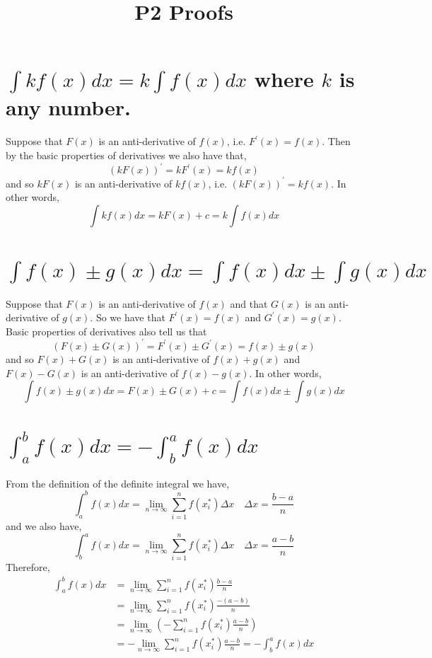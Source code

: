 \documentclass[10pt]{article}
\title{P2 Proofs }
\author{}
\date{}
\begin{document}
\maketitle
\section{$\int k f(x) d x=k \int f(x) d x$ where $k$ is any number. }
Suppose that $F(x)$ is an anti-derivative of $f(x)$, i.e. $F^{\prime}(x)=f(x)$. Then by the basic properties of derivatives we also have that,
$$
(k F(x))^{\prime}=k F^{\prime}(x)=k f(x)
$$
and so $k F(x)$ is an anti-derivative of $k f(x)$, i.e. $(k F(x))^{\prime}=k f(x)$. In other words,
$$
\int k f(x) d x=k F(x)+c=k \int f(x) d x
$$

\section{$\int f(x) \pm g(x) d x=\int f(x) d x \pm \int g(x) d x$}
Suppose that $F(x)$ is an anti-derivative of $f(x)$ and that $G(x)$ is an anti-derivative of $g(x)$. So we have that $F^{\prime}(x)=f(x)$ and $G^{\prime}(x)=g(x)$. Basic properties of derivatives also tell us that
$$
(F(x) \pm G(x))^{\prime}=F^{\prime}(x) \pm G^{\prime}(x)=f(x) \pm g(x)
$$
and so $F(x)+G(x)$ is an anti-derivative of $f(x)+g(x)$ and $F(x)-G(x)$ is an anti-derivative of $f(x)-g(x)$. In other words,
$$
\int f(x) \pm g(x) d x=F(x) \pm G(x)+c=\int f(x) d x \pm \int g(x) d x
$$

\section{$\int_{a}^{b} f(x) d x=-\int_{b}^{a} f(x) d x$}
From the definition of the definite integral we have,
$$
\int_{a}^{b} f(x) d x=\lim _{n \rightarrow \infty} \sum_{i=1}^{n} f\left(x_{i}^{*}\right) \Delta x \quad \Delta x=\frac{b-a}{n}
$$
and we also have,
$$
\int_{b}^{a} f(x) d x=\lim _{n \rightarrow \infty} \sum_{i=1}^{n} f\left(x_{i}^{*}\right) \Delta x \quad \Delta x=\frac{a-b}{n}
$$
Therefore,
$$
\begin{aligned}
\int_{a}^{b} f(x) d x &=\lim _{n \rightarrow \infty} \sum_{i=1}^{n} f\left(x_{i}^{*}\right) \frac{b-a}{n} \\
&=\lim _{n \rightarrow \infty} \sum_{i=1}^{n} f\left(x_{i}^{*}\right) \frac{-(a-b)}{n} \\
&=\lim _{n \rightarrow \infty}\left(-\sum_{i=1}^{n} f\left(x_{i}^{*}\right) \frac{a-b}{n}\right) \\
&=-\lim _{n \rightarrow \infty} \sum_{i=1}^{n} f\left(x_{i}^{*}\right) \frac{a-b}{n}=-\int_{b}^{a} f(x) d x
\end{aligned}
$$
\end{document}
